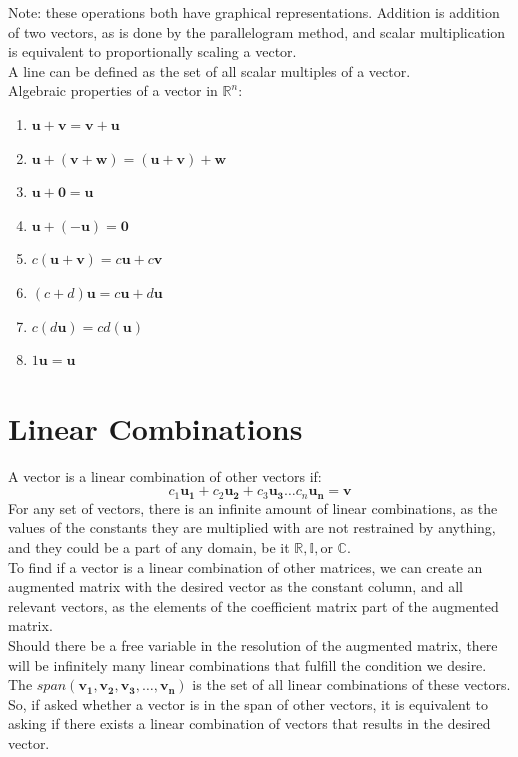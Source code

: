 \documentclass[nobib]{tufte-handout}
\begin{document}
Note: these operations both have graphical representations. Addition is addition of two vectors, as is done by the parallelogram method, and scalar multiplication is equivalent to proportionally scaling a vector.\\
A line can be defined as the set of all scalar multiples of a vector.\\
Algebraic properties of a vector in $\mathbb{R}^n$:
\begin{enumerate}
    \item $\mathbf{u}+\mathbf{v} = \mathbf{v}+\mathbf{u}$
    \item $\mathbf{u} + (\mathbf{v}+\mathbf{w}) = (\mathbf{u}+\mathbf{v})+\mathbf{w}$
    \item $\mathbf{u}+\mathbf{0} = \mathbf{u}$
    \item $\mathbf{u}+(-\mathbf{u})=\mathbf{0}$
    \item $c(\mathbf{u}+\mathbf{v}) = c\mathbf{u}+c\mathbf{v}$
    \item $(c+d)\mathbf{u} = c\mathbf{u}+d\mathbf{u}$
    \item  $c(d\mathbf{u}) = cd(\mathbf{u})$
    \item $1\mathbf{u} = \mathbf{u}$
\end{enumerate}
\section{Linear Combinations}
A vector is a linear combination of other vectors if:
\begin{equation*}
    c_1\mathbf{u_1}+c_2\mathbf{u_2}+c_3\mathbf{u_3} \ldots c_n\mathbf{u_n} = \mathbf{v}
\end{equation*}
For any set of vectors, there is an infinite amount of linear combinations, as the values of the constants they are multiplied with are not restrained by anything, and they could be a part of any domain, be it $\mathbb{R}, \mathbb{I}, \text{or } \mathbb{C}$.\\
To find if a vector is a linear combination of other matrices, we can create an augmented matrix with the desired vector as the constant column, and all relevant vectors, as the elements of the coefficient matrix part of the augmented matrix.\\
Should there be a free variable in the resolution of the augmented matrix, there will be infinitely many linear combinations that fulfill the condition we desire.\\
The $span(\mathbf{v_1}, \mathbf{v_2}, \mathbf{v_3}, \ldots, \mathbf{v_n})$ is the set of all linear combinations of these vectors. So, if asked whether a vector is in the span of other vectors, it is equivalent to asking if there exists a linear combination of vectors that results in the desired vector.\\
\end{document}
